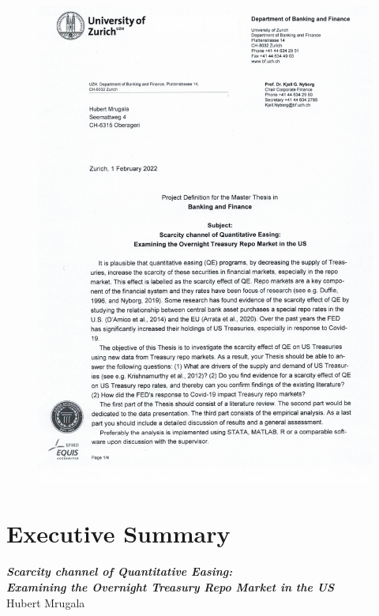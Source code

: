 \documentclass[11pt,a4paper,english,oneside]{article}
\begin{document}
\begin{figure}[h!]
  \begin{center}
    \includegraphics[page=4,width=.86\textwidth]{../../project_definition.pdf}
  \end{center}
\end{figure}

\thispagestyle{firststyle}
\newpage

\section*{Executive Summary}
\thispagestyle{firststyle}

\lipsum[1-3] %

\newpage
\tableofcontents
\newpage
\listoffigures
\listoftables
\newpage
{}

\begin{center}
  {\Large \emph{\textbf{Scarcity channel of Quantitative Easing:\\
  Examining the Overnight Treasury Repo Market in the US}}}\\[4pt]
  Hubert Mrugala
\end{center}
\end{document}
